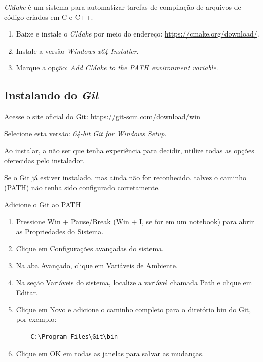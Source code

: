 \documentclass[a4paper,11pt]{article}
\newcommand{\cmake}{\textit{CMake}}
\begin{document}
\cmake{} é um sistema para automatizar tarefas de compilação de arquivos de código criados em C e C++. 

\begin{enumerate}
	\item Baixe e instale o \cmake{} por meio do endereço: \url{https://cmake.org/download/}.
	\item Instale a versão \textit{Windows x64 Installer}.
	\item Marque a opção: \textit{Add CMake to the PATH environment variable}.
\end{enumerate}


\subsection*{Instalando do \textit{Git}}

Acesse o site oficial do Git: \url{https://git-scm.com/download/win}

Selecione esta versão: \textit{64-bit Git for Windows Setup}.

Ao instalar, a não ser que tenha experiência para decidir, utilize todas as opções oferecidas pelo instalador.

Se o Git já estiver instalado, mas ainda não for reconhecido, talvez o caminho (PATH) não tenha sido configurado corretamente.

Adicione o Git ao PATH


\begin{enumerate}

	\item Pressione Win + Pause/Break (Win + I, se for em um notebook) para abrir as Propriedades do Sistema.
	\item Clique em Configurações avançadas do sistema.
	\item Na aba Avançado, clique em Variáveis de Ambiente.
	\item Na seção Variáveis do sistema, localize a variável chamada Path e clique em Editar.
	\item Clique em Novo e adicione o caminho completo para o diretório bin do Git, por exemplo:
	
	\begin{verbatim}
	C:\Program Files\Git\bin
	\end{verbatim}
	
	\item Clique em OK em todas as janelas para salvar as mudanças.

\end{enumerate}
\end{document}
